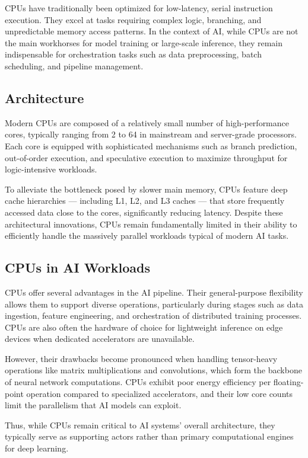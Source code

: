 \documentclass[openany]{book}
\begin{document}
CPUs have traditionally been optimized for low-latency, serial instruction 
execution. They excel at tasks requiring complex logic, branching, and 
unpredictable memory access patterns. In the context of AI, while CPUs are not 
the main workhorses for model training or large-scale inference, they remain 
indispensable for orchestration tasks such as data preprocessing, batch 
scheduling, and pipeline management.

\subsection{Architecture}
Modern CPUs are composed of a relatively small number of high-performance cores, 
typically ranging from 2 to 64 in mainstream and server-grade processors. Each 
core is equipped with sophisticated mechanisms such as branch prediction, 
out-of-order execution, and speculative execution to maximize throughput for 
logic-intensive workloads.

To alleviate the bottleneck posed by slower main memory, CPUs feature deep cache 
hierarchies — including L1, L2, and L3 caches — that store frequently accessed 
data close to the cores, significantly reducing latency. Despite these 
architectural innovations, CPUs remain fundamentally limited in their ability to 
efficiently handle the massively parallel workloads typical of modern AI tasks.

\subsection{CPUs in AI Workloads}
CPUs offer several advantages in the AI pipeline. Their general-purpose 
flexibility allows them to support diverse operations, particularly during 
stages such as data ingestion, feature engineering, and orchestration of 
distributed training processes. CPUs are also often the hardware of choice for 
lightweight inference on edge devices when dedicated accelerators are 
unavailable.

However, their drawbacks become pronounced when handling tensor-heavy operations 
like matrix multiplications and convolutions, which form the backbone of neural 
network computations. CPUs exhibit poor energy efficiency per floating-point 
operation compared to specialized accelerators, and their low core counts limit 
the parallelism that AI models can exploit.

Thus, while CPUs remain critical to AI systems' overall architecture, they 
typically serve as supporting actors rather than primary computational engines 
for deep learning.
\end{document}
